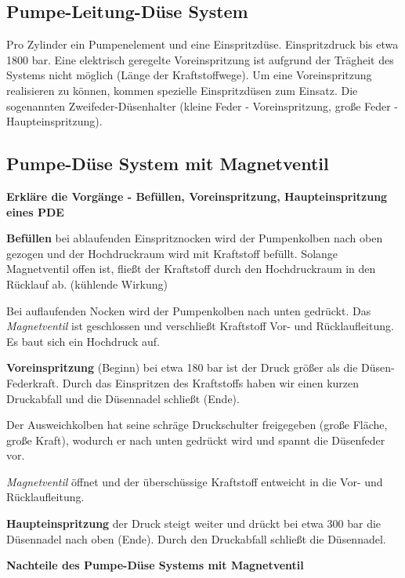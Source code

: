 \subsection{Pumpe-Leitung-Düse
System}\label{pumpe-leitung-duese-system}

Pro Zylinder ein Pumpenelement und eine Einspritzdüse. Einspritzdruck
bis etwa 1800 bar. Eine elektrisch geregelte Voreinspritzung ist
aufgrund der Trägheit des Systems nicht möglich (Länge der
Kraftstoffwege). Um eine Voreinspritzung realisieren zu können, kommen
spezielle Einspritzdüsen zum Einsatz. Die sogenannten
Zweifeder-Düsenhalter (kleine Feder - Voreinspritzung, große Feder -
Haupteinspritzung).

\newpage

\subsection{Pumpe-Düse System mit
Magnetventil}\label{pumpe-duese-system-mit-magnetventil}

\textbf{Erkläre die Vorgänge - Befüllen, Voreinspritzung,
Haupteinspritzung eines PDE}

\textbf{Befüllen} bei ablaufenden Einspritznocken wird der Pumpenkolben
nach oben gezogen und der Hochdruckraum wird mit Kraftstoff befüllt.
Solange Magnetventil offen ist, fließt der Kraftstoff durch den
Hochdruckraum in den Rücklauf ab. (kühlende Wirkung)

Bei auflaufenden Nocken wird der Pumpenkolben nach unten gedrückt. Das
\emph{Magnetventil} ist geschlossen und verschließt Kraftstoff Vor- und
Rücklaufleitung. Es baut sich ein Hochdruck auf.

\textbf{Voreinspritzung} (Beginn) bei etwa 180 bar ist der Druck größer
als die Düsen-Federkraft. Durch das Einspritzen des Kraftstoffs haben
wir einen kurzen Druckabfall und die Düsennadel schließt (Ende).

Der Ausweichkolben hat seine schräge Druckschulter freigegeben (große
Fläche, große Kraft), wodurch er nach unten gedrückt wird und spannt die
Düsenfeder vor.

\emph{Magnetventil} öffnet und der überschüssige Kraftstoff entweicht in
die Vor- und Rücklaufleitung.

\textbf{Haupteinspritzung} der Druck steigt weiter und drückt bei etwa
300 bar die Düsennadel nach oben (Ende). Durch den Druckabfall schließt
die Düsennadel.

\textbf{Nachteile des Pumpe-Düse Systems mit Magnetventil}

